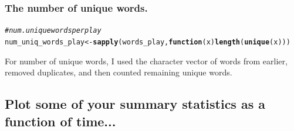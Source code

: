\documentclass{article}\usepackage[]{graphicx}\usepackage[]{color}
\makeatletter
\newcommand{\hlcom}[1]{\textcolor[rgb]{0.678,0.584,0.686}{\textit{#1}}}%
\newcommand{\hlstd}[1]{\textcolor[rgb]{0.345,0.345,0.345}{#1}}%
\newcommand{\hlkwa}[1]{\textcolor[rgb]{0.161,0.373,0.58}{\textbf{#1}}}%
\newcommand{\hlkwb}[1]{\textcolor[rgb]{0.69,0.353,0.396}{#1}}%
\newcommand{\hlkwc}[1]{\textcolor[rgb]{0.333,0.667,0.333}{#1}}%
\newcommand{\hlkwd}[1]{\textcolor[rgb]{0.737,0.353,0.396}{\textbf{#1}}}%
\newenvironment{kframe}{%
 \def\at@end@of@kframe{}%
 \ifinner\ifhmode%
  \def\at@end@of@kframe{\end{minipage}}%
  \begin{minipage}{\columnwidth}%
 \fi\fi%
 \def\FrameCommand##1{\hskip\@totalleftmargin \hskip-\fboxsep
 \colorbox{shadecolor}{##1}\hskip-\fboxsep
     \hskip-\linewidth \hskip-\@totalleftmargin \hskip\columnwidth}%
 \MakeFramed {\advance\hsize-\width
   \@totalleftmargin\z@ \linewidth\hsize
   \@setminipage}}%
 {\par\unskip\endMakeFramed%
 \at@end@of@kframe}
\newenvironment{knitrout}{}{} %
\makeatother
\begin{document}
\subsubsection{The number of unique words.}
\begin{knitrout}
\color{fgcolor}\begin{kframe}
\begin{alltt}
\hlcom{#num. unique words per play}
\hlstd{num_uniq_words_play} \hlkwb{<-} \hlkwd{sapply}\hlstd{(words_play,} \hlkwa{function}\hlstd{(}\hlkwc{x}\hlstd{)} \hlkwd{length}\hlstd{(}\hlkwd{unique}\hlstd{(x)))}
\end{alltt}
\end{kframe}
\end{knitrout}
For number of unique words, I used the character vector of words from earlier, removed duplicates, and then counted remaining unique words.

\subsection{Plot some of your summary statistics as a function of time...} %
\end{document}
